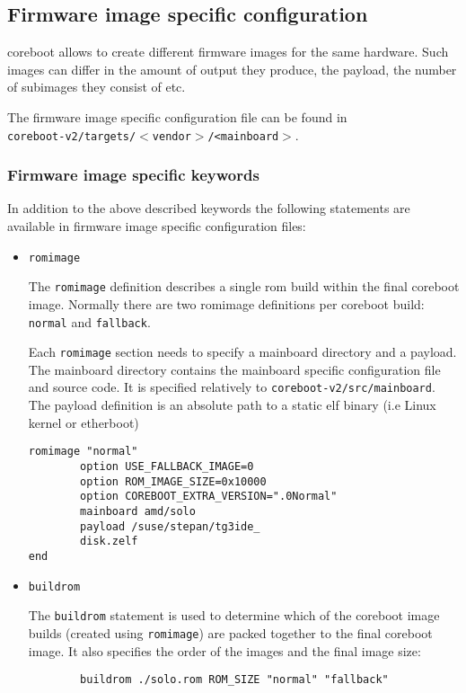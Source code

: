 \documentclass[titlepage,12pt]{article}
\begin{document}
\subsection{Firmware image specific configuration}
coreboot allows to create different firmware images for the same
hardware. Such images can differ in the amount of output they produce,
the payload, the number of subimages they consist of etc.

The firmware image specific configuration file can be found in \\
\texttt{coreboot-v2/targets/$<$vendor$>$/<mainboard$>$}.

\subsubsection{Firmware image specific keywords}
In addition to the above described keywords the following statements are
available in firmware image specific configuration files:

\begin{itemize}
\item \begin{verbatim}romimage\end{verbatim}

The \texttt{romimage} definition describes a single rom build within the
final coreboot image. Normally there are two romimage definitions per
coreboot build: \texttt{normal} and \texttt{fallback}.

Each \texttt{romimage} section needs to specify a mainboard directory and a
payload. The mainboard directory contains the mainboard specific
configuration file and source code. It is specified relatively to
\texttt{coreboot-v2/src/mainboard}. The payload definition is an absolute
path to a static elf binary (i.e Linux kernel or etherboot)

\begin{verbatim}
romimage "normal"
        option USE_FALLBACK_IMAGE=0
        option ROM_IMAGE_SIZE=0x10000
        option COREBOOT_EXTRA_VERSION=".0Normal"
        mainboard amd/solo
        payload /suse/stepan/tg3ide_
        disk.zelf
end
\end{verbatim}

\item \begin{verbatim}buildrom\end{verbatim}

The \texttt{buildrom} statement is used to determine which of the
coreboot image builds (created using \texttt{romimage}) are packed
together to the final coreboot image. It also specifies the order of
the images and the final image size:

\begin{verbatim}
        buildrom ./solo.rom ROM_SIZE "normal" "fallback"
\end{verbatim}

\end{itemize}
\end{document}

